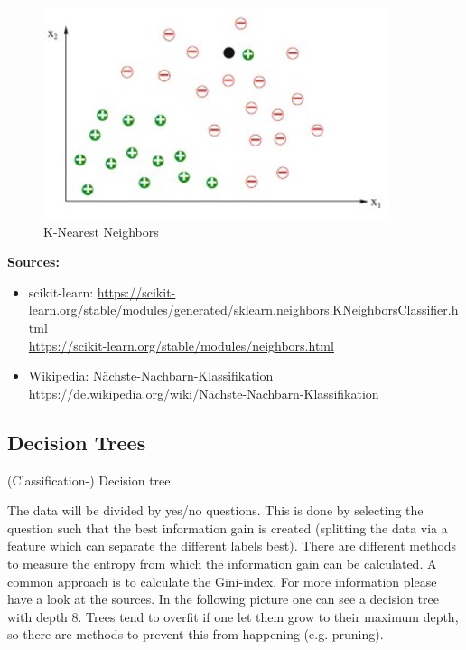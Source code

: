 \begin{figure}[hbtp]
	\centering
	\includegraphics[scale=0.8]{knn2}
	\caption{K-Nearest Neighbors}
	\label{fig:Datensatz - unbearbeitet}
\end{figure}
 
 
\textbf{Sources:}
\begin{itemize}
\item scikit-learn: \hyperlink{https://scikit-learn.org/stable/modules/generated/sklearn.neighbors.KNeighborsClassifier.html}{https://scikit-learn.org/stable/modules/generated/sklearn.neighbors.KNeighborsClassifier.html} \\
\hyperlink{https://scikit-learn.org/stable/modules/neighbors.html}{https://scikit-learn.org/stable/modules/neighbors.html}
\item Wikipedia: Nächste-Nachbarn-Klassifikation \hyperlink{https://de.wikipedia.org/wiki/Nächste-Nachbarn-Klassifikation}{https://de.wikipedia.org/wiki/Nächste-Nachbarn-Klassifikation}
\end{itemize} 

\subsection{Decision Trees}

(Classification-) Decision tree

The data will be divided by yes/no questions. This is done by selecting the question such that the best information gain is created (splitting the data via a feature which can separate the different labels best). There are different methods to measure the entropy from which the information gain can be calculated. A common approach is to calculate the Gini-index. For more information please have a look at the sources. In the following picture one can see a decision tree with depth 8. Trees tend to overfit if one let them grow to their maximum depth, so there are methods to prevent this from happening (e.g. pruning).

